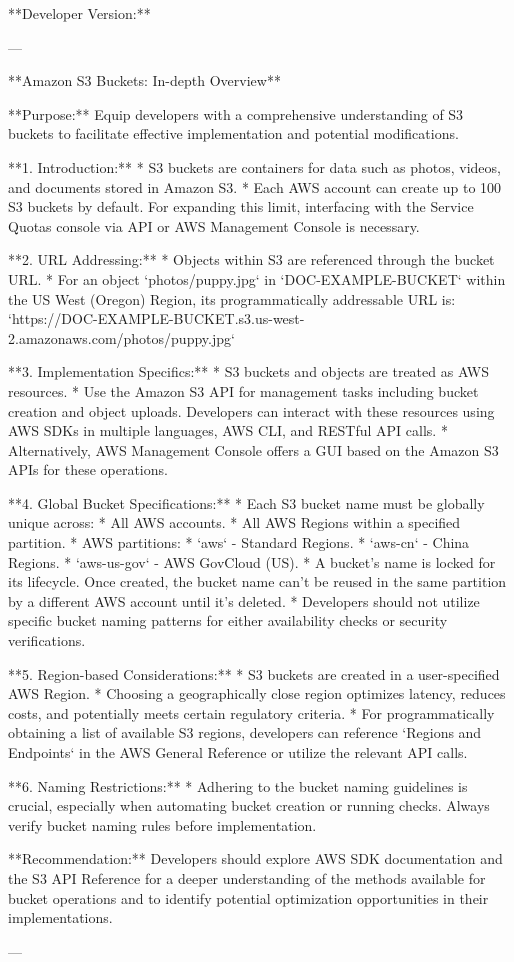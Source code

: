 **Developer Version:**

---

**Amazon S3 Buckets: In-depth Overview**

**Purpose:** Equip developers with a comprehensive understanding of S3 buckets to facilitate effective implementation and potential modifications.

**1. Introduction:**
   * S3 buckets are containers for data such as photos, videos, and documents stored in Amazon S3.
   * Each AWS account can create up to 100 S3 buckets by default. For expanding this limit, interfacing with the Service Quotas console via API or AWS Management Console is necessary.

**2. URL Addressing:**
   * Objects within S3 are referenced through the bucket URL. 
   * For an object `photos/puppy.jpg` in `DOC-EXAMPLE-BUCKET` within the US West (Oregon) Region, its programmatically addressable URL is: 
     `https://DOC-EXAMPLE-BUCKET.s3.us-west-2.amazonaws.com/photos/puppy.jpg`
   
**3. Implementation Specifics:**
   * S3 buckets and objects are treated as AWS resources.
   * Use the Amazon S3 API for management tasks including bucket creation and object uploads. Developers can interact with these resources using AWS SDKs in multiple languages, AWS CLI, and RESTful API calls.
   * Alternatively, AWS Management Console offers a GUI based on the Amazon S3 APIs for these operations.

**4. Global Bucket Specifications:**
   * Each S3 bucket name must be globally unique across:
     * All AWS accounts.
     * All AWS Regions within a specified partition.
   * AWS partitions:
     * `aws` - Standard Regions.
     * `aws-cn` - China Regions.
     * `aws-us-gov` - AWS GovCloud (US).
   * A bucket’s name is locked for its lifecycle. Once created, the bucket name can’t be reused in the same partition by a different AWS account until it's deleted.
   * Developers should not utilize specific bucket naming patterns for either availability checks or security verifications.

**5. Region-based Considerations:**
   * S3 buckets are created in a user-specified AWS Region.
   * Choosing a geographically close region optimizes latency, reduces costs, and potentially meets certain regulatory criteria.
   * For programmatically obtaining a list of available S3 regions, developers can reference `Regions and Endpoints` in the AWS General Reference or utilize the relevant API calls.
   
**6. Naming Restrictions:**
   * Adhering to the bucket naming guidelines is crucial, especially when automating bucket creation or running checks. Always verify bucket naming rules before implementation.

**Recommendation:** Developers should explore AWS SDK documentation and the S3 API Reference for a deeper understanding of the methods available for bucket operations and to identify potential optimization opportunities in their implementations.

---